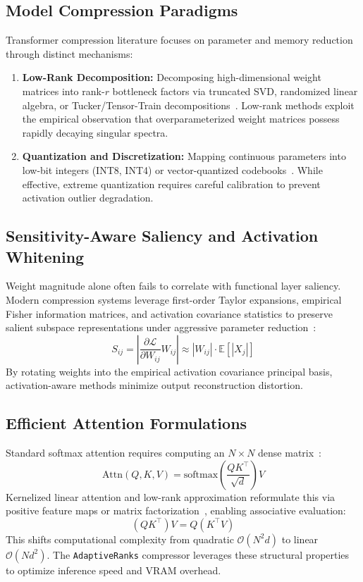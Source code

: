 \subsection{Model Compression Paradigms}
Transformer compression literature focuses on parameter and memory reduction through distinct mechanisms:
\begin{enumerate}
\item \textbf{Low-Rank Decomposition:} Decomposing high-dimensional weight matrices into rank-$r$ bottleneck factors via truncated SVD, randomized linear algebra, or Tucker/Tensor-Train decompositions~\citep{eckart1936,halko2011,wang2024svdllm,yuan2023asvd,hsu2022fwsvd,chen2021drone,lan2020albert,novikov2015tensor}. Low-rank methods exploit the empirical observation that overparameterized weight matrices possess rapidly decaying singular spectra.
\item \textbf{Quantization and Discretization:} Mapping continuous parameters into low-bit integers (INT8, INT4) or vector-quantized codebooks~\citep{frantar2023gptq,lin2024awq,xiao2023smoothquant}. While effective, extreme quantization requires careful calibration to prevent activation outlier degradation.
\end{enumerate}

\subsection{Sensitivity-Aware Saliency and Activation Whitening}
Weight magnitude alone often fails to correlate with functional layer saliency. Modern compression systems leverage first-order Taylor expansions, empirical Fisher information matrices, and activation covariance statistics to preserve salient subspace representations under aggressive parameter reduction~\citep{kirkpatrick2017,molchanov2019}:
\[
S_{ij} = \left| \frac{\partial \mathcal{L}}{\partial W_{ij}} W_{ij} \right| \approx |W_{ij}| \cdot \mathbb{E}[|X_j|]
\]
By rotating weights into the empirical activation covariance principal basis, activation-aware methods minimize output reconstruction distortion.

\subsection{Efficient Attention Formulations}
Standard softmax attention requires computing an $N \times N$ dense matrix~\citep{vaswani2017}:
\[
\text{Attn}(Q, K, V) = \text{softmax}\left(\frac{Q K^\top}{\sqrt{d}}\right) V
\]
Kernelized linear attention and low-rank approximation reformulate this via positive feature maps or matrix factorization~\citep{katharopoulos2020,choromanski2021,xiong2021nystromformer}, enabling associative evaluation:
\[
(Q K^\top) V = Q (K^\top V)
\]
This shifts computational complexity from quadratic $\mathcal{O}(N^2 d)$ to linear $\mathcal{O}(N d^2)$. The \texttt{AdaptiveRanks} compressor leverages these structural properties to optimize inference speed and VRAM overhead.


